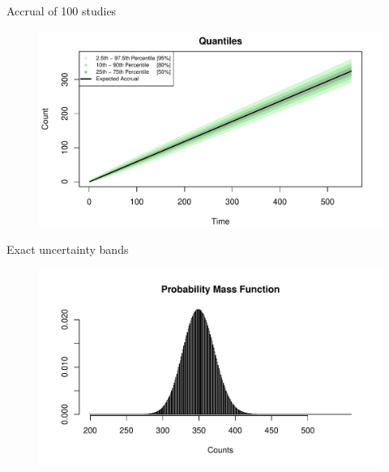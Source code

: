 \documentclass[english]{beamer}\usepackage[]{graphicx}\usepackage[]{xcolor}
\makeatletter
\def\maxwidth{ %
  \ifdim\Gin@nat@width>\linewidth
    \linewidth
  \else
    \Gin@nat@width
  \fi
}
\newenvironment{knitrout}{}{} %
\makeatother
\begin{document}
\begin{frame}{Accrual of 100 studies}

\begin{figure}
\begin{knitrout}
\color{fgcolor}
\includegraphics[width=\maxwidth]{figures/figunnamed-chunk-5-1} 
\end{knitrout}

\end{figure}

\end{frame}

\begin{frame}{Exact uncertainty bands}
\begin{figure}
\begin{knitrout}
\color{fgcolor}
\includegraphics[width=\maxwidth]{figures/figunnamed-chunk-6-1} 
\end{knitrout}
\end{figure}
\end{frame}
\end{document}
